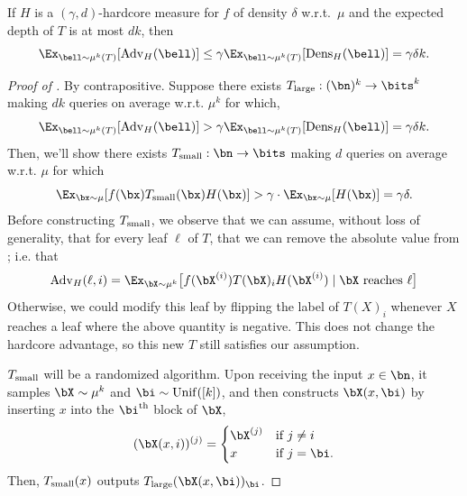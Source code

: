 \documentclass[11pt]{article}
\newcommand{\dens}{\mathrm{Dens}}
\newcommand{\adv}{\mathrm{Adv}}
\newcommand{\Dens}{\mathrm{Dens}}
\newcommand{\Adv}{\mathrm{Adv}}
\begin{document}
\begin{lemma}
\label{lem:expected total hardcore advantage body}
    If $H$ is a $(\gamma, d)$-hardcore measure for $f$ of density $\delta$ w.r.t.~$\mu$ and the expected depth of $T$ is at most $dk$, then 
    \begin{equation*}
        \Ex_{\bell \sim \mu^k(T)}[\adv_H(\bell)] \leq \gamma \Ex_{\bell\sim\mu^k(T)}[\Dens_H(\bell)] = \gamma \delta k. 
    \end{equation*}
\end{lemma}
\begin{proof}[Proof of ]
    By contrapositive. Suppose there exists $T_{\textnormal{large}}:(\bn)^k \to \bits^k$ making $dk$ queries on average w.r.t. $\mu^k$ for which,
    \begin{equation*}
        \Ex_{\bell \sim \mu^k(T)}[\adv_H(\bell)] > \gamma \Ex_{\bell\sim \mu^k(T)}[\dens_H(\bell)] = \gamma\delta k.
    \end{equation*}
    Then, we'll show there exists $T_{\textnormal{small}}:\bn \to \bits$ making $d$ queries on average w.r.t. $\mu$ for which
    \begin{equation*}
        \Ex_{\bx \sim \mu}[ f(\bx) T_{\textnormal{small}}(\bx) H(\bx)] > \gamma \cdot \Ex_{\bx \sim \mu}[H(\bx)] = \gamma \delta.
    \end{equation*}
    Before constructing $T_{\textnormal{small}}$, we observe that we can assume, without loss of generality, that for every leaf $\ell$ of $T$, that we can remove the absolute value from ; i.e. that
    \begin{equation*}
        \Adv_H(\ell,i) = \Ex_{\bX\sim \mu^k}\big[ f(\bX^{(i)})T(\bX)_i H(\bX^{(i)})\mid \text{$\bX$ reaches $\ell$}\big]
    \end{equation*}
    Otherwise, we could modify this leaf by flipping the label of $T(X)_i$ whenever $X$ reaches a leaf where the above quantity is negative. This does not change the hardcore advantage, so this new $T$ still satisfies our assumption.
    
    $T_{\textnormal{small}}$ will be a randomized algorithm. Upon receiving the input $x \in \bn$, it samples $\bX \sim \mu^k$ and $\bi \sim \mathrm{Unif}([k])$, and then constructs $\bX(x, \bi)$ by inserting $x$ into the $\bi^{\text{th}}$ block of $\bX$,
    \begin{equation*}
        (\bX(x, i))^{(j)} = \begin{cases}
            \bX^{(j)} &\text{if }j \neq i\\
            x&\text{if }j = \bi.
        \end{cases}
    \end{equation*}
    Then, $T_{\textnormal{small}}(x)$ outputs $T_{\textnormal{large}}(\bX(x, \bi))_{\bi}$.


\end{proof}
\end{document}
